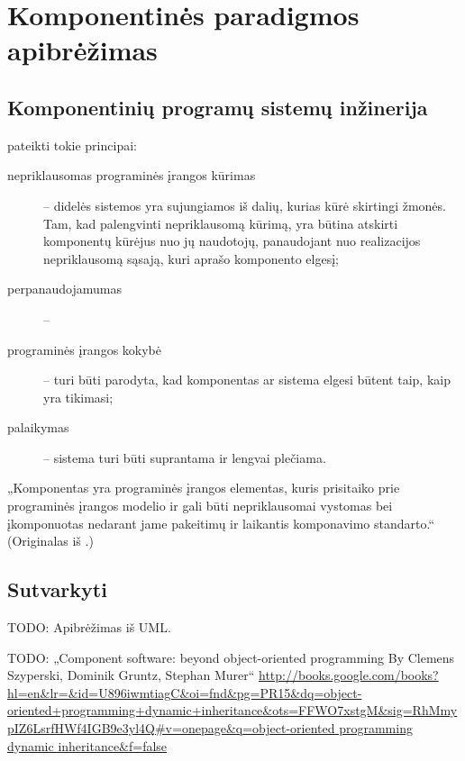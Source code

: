 \chapter{Komponentinės paradigmos apibrėžimas}

\section{Komponentinių programų sistemų inžinerija}

\cite{analytical-study-cbse} pateikti tokie principai:
\begin{description}
  \item[nepriklausomas programinės įrangos kūrimas]  – didelės sistemos yra sujungiamos iš dalių,
    kurias kūrė skirtingi žmonės. Tam, kad palengvinti nepriklausomą
    kūrimą, yra būtina atskirti komponentų kūrėjus nuo jų naudotojų,
    panaudojant nuo realizacijos nepriklausomą sąsają, kuri aprašo
    komponento elgesį;
  \item[perpanaudojamumas]  – 
  \item[programinės įrangos kokybė]  – turi
    būti parodyta, kad komponentas ar sistema elgesi būtent taip, kaip
    yra tikimasi;
  \item[palaikymas]  – sistema turi būti suprantama
    ir lengvai plečiama.
\end{description}

„Komponentas yra programinės įrangos elementas, kuris prisitaiko prie
programinės įrangos modelio ir gali būti nepriklausomai vystomas
bei įkomponuotas nedarant jame pakeitimų ir laikantis komponavimo
standarto.“\cite[438]{analytical-study-cbse} (Originalas iš
\cite{heineman2001component}.)

\section{Sutvarkyti}

TODO: Apibrėžimas iš UML.

TODO: „Component software: beyond object-oriented programming By
Clemens Szyperski, Dominik Gruntz, Stephan Murer“
\url{http://books.google.com/books?hl=en&lr=&id=U896iwmtiagC&oi=fnd&pg=PR15&dq=object-oriented+programming+dynamic+inheritance&ots=FFWO7xstgM&sig=RhMmypIZ6LsrfHWf4IGB9e3yl4Q#v=onepage&q=object-oriented programming dynamic inheritance&f=false}
